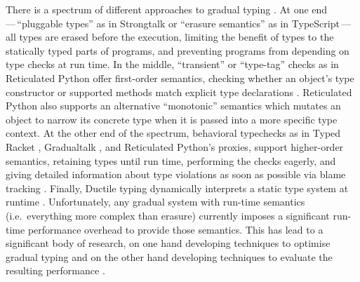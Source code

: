 \documentclass[sigplan,10pt,review,screen]{acmart}\settopmatter{printfolios=true}
\begin{document}
There is a spectrum of different approaches to gradual typing
\cite{kafka18,bensurvey18icfp}.
At one end\,---\,``pluggable types'' as in Strongtalk \cite{strongtalk} or ``erasure
semantics'' as in 
TypeScript\citep{typeScriptECOOP}\,---\,
%
all types are erased before the execution, limiting the benefit of
types to the statically typed parts of programs, and preventing
programs from depending on type checks at run time.  In the middle,
``transient'' or ``type-tag'' checks as in Reticulated Python 
offer first-order semantics, checking
whether an object's type constructor or supported methods match
explicit type declarations
\cite{Siek2007,Bloom2009,concrete15,reticPython2014,Greenman2018}.
Reticulated Python also supports an alternative ``monotonic'' semantics
which mutates an object to narrow its concrete type when it is passed
into a more specific type context.
At the other end of the spectrum, behavioral
typechecks as in Typed Racket \cite{typedScheme08,takikawa2012},
Gradualtalk \cite{gradualtalk14},
and Reticulated Python's proxies,
support higher-order semantics, retaining
types until run 
time, performing the checks eagerly, and giving detailed information
about type violations as soon as possible via blame
tracking \cite{blame2009,blameForAll2011}.
Finally, Ductile typing
dynamically interprets a static type system at runtime
\cite{Ductile2011}.
%
%
Unfortunately, any gradual system with run-time semantics
(i.e.\ everything more complex than erasure) currently
imposes a significant run-time performance overhead to provide those
semantics.  This has lead to a significant body of research,
on one hand developing techniques to optimise gradual typing 
\citep{Vitousek2017,Muehlboeck2017,Bauman2017,Richards2017,Greenman2018}
and on the other hand developing techniques to evaluate the
resulting performance  \cite{Takikawa2016,Greenman2019jfp}.
\end{document}
